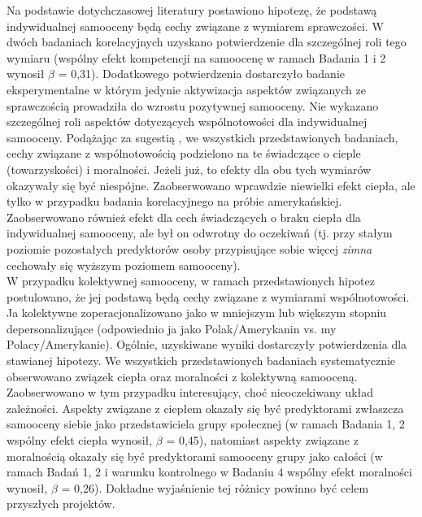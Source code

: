 \documentclass[man]{apa6}
\begin{document}
Na podstawie dotychczasowej literatury postawiono hipotezę, że podstawą indywidualnej samooceny będą cechy związane z wymiarem sprawczości. W dwóch badaniach korelacyjnych uzyskano potwierdzenie dla szczególnej roli tego wymiaru (wspólny efekt kompetencji na samoocenę w ramach Badania 1 i 2 wynosił $\beta$ = 0,31). Dodatkowego potwierdzenia dostarczyło badanie eksperymentalne w którym jedynie aktywizacja aspektów związanych ze sprawczością prowadziła do wzrostu pozytywnej samooceny. Nie wykazano szczególnej roli aspektów dotyczących wspólnotowości dla indywidualnej samooceny. Podążając za sugestią \textcite{brambilla2014importance}, we wszystkich przedstawionych badaniach, cechy związane z wspólnotowością podzielono na te świadczące o cieple (towarzyskości) i moralności. Jeżeli już, to efekty dla obu tych wymiarów okazywały się być niespójne. Zaobserwowano wprawdzie niewielki efekt ciepła, ale tylko w przypadku badania korelacyjnego na próbie amerykańskiej. Zaobserwowano również efekt dla cech świadczących o braku ciepła dla indywidualnej samooceny, ale był on odwrotny do oczekiwań (tj. przy stałym poziomie pozostałych predyktorów osoby przypisujące sobie więcej \emph{zimna} cechowały się wyższym poziomem samooceny).\\

W przypadku kolektywnej samooceny, w ramach przedstawionych hipotez postulowano, że jej podstawą będą cechy związane z wymiarami wspólnotowości. Ja kolektywne zoperacjonalizowano jako w mniejszym lub większym stopniu depersonalizujące (odpowiednio ja jako Polak/Amerykanin vs. my Polacy/Amerykanie). Ogólnie, uzyskiwane wyniki dostarczyły potwierdzenia dla stawianej hipotezy. We wszystkich przedstawionych badaniach systematycznie obserwowano związek ciepła oraz moralności z kolektywną samooceną. Zaobserwowano w tym przypadku interesujący, choć nieoczekiwany układ zależności. Aspekty związane z ciepłem okazały się być predyktorami zwłaszcza samooceny siebie jako przedstawiciela grupy społecznej (w ramach Badania 1, 2 wspólny efekt ciepła wynosił, $\beta$ = 0,45), natomiast aspekty związane z moralnością okazały się być predyktorami samooceny grupy jako całości (w ramach Badań 1, 2 i warunku kontrolnego w Badaniu 4 wspólny efekt moralności wynosił, $\beta$ = 0,26). Dokładne wyjaśnienie tej różnicy powinno być celem przyszłych projektów. \\
\end{document}
